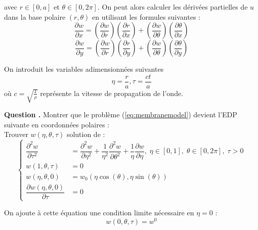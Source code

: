 \documentclass[a4,12pt]{article}
\newcounter{Nbquestion}
\newcommand*\question{%
\stepcounter{Nbquestion}%
\textbf{Question \theNbquestion. }}
\begin{document}
avec $r \in[0,a]$ et $\theta  \in [0,2\pi]$. On peut alors calculer les dérivées partielles de $u$ dans la base polaire $(r,\theta)$ en utilisant les formules suivantes :
\[
\dfrac{\partial w}{\partial x}=\left(\dfrac{\partial w}{\partial r}\right)\left(\dfrac{\partial r}{\partial x}\right)+\left(\dfrac{\partial w}{\partial \theta}\right)\left(\dfrac{\partial \theta}{\partial x}\right)
\]
\[
\dfrac{\partial w}{\partial y}=\left(\dfrac{\partial w}{\partial r}\right)\left(\dfrac{\partial r}{\partial y}\right)+\left(\dfrac{\partial w}{\partial \theta}\right)\left(\dfrac{\partial \theta}{\partial y}\right)
\]

On introduit les variables adimensionnées suivantes 
\[
\eta=\dfrac{r}{a},\tau=\dfrac{ct}{a}
\]
où $c=\sqrt{\frac{T}{\rho}}$ représente la vitesse de propagation  de l'onde.\\ 


\begin{mdframed}[style=exampledefault]
\question Montrer que le problème (\ref{eq:membranemodel}) devient l'EDP suivante en coordonnées polaires :\\

Trouver $w(\eta,\theta,\tau)$ solution de :
\begin{equation}
	\left\{
	\begin{array}{rl}
		 \dfrac{\partial^2 w}{\partial \tau^2} & =   \dfrac{\partial^2 w}{\partial \eta^2}+\dfrac{1}
		 {\eta^2}\dfrac{\partial^2 w}{\partial \theta^2}+\dfrac{1}{\eta}\dfrac{\partial w}{\partial \eta},\;\eta\in[0,1],\;		\theta\in[0,2\pi],\;\tau>0\\
		w(1,\theta,\tau)& = 0  \\
		w(\eta,\theta,0)& = w_0(\eta \cos(\theta),\eta \sin (\theta)) \\
		\dfrac{\partial w(\eta,\theta,0)}{\partial \tau} & = 0
	\end{array}
	\right.
	\label{eq:polarmodel}
\end{equation}

On ajoute à cette équation une condition limite nécessaire  en $\eta=0$ :
\[
w(0,\theta,\tau)=w^0
\]
\end{mdframed}

\end{document}
